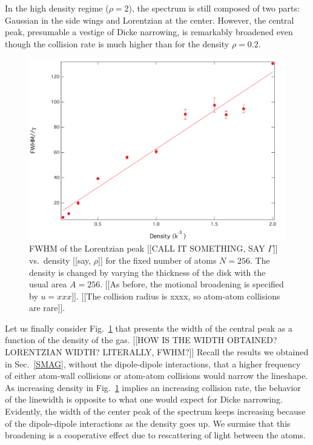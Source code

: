In the high density regime ($\rho =2$), the spectrum is still composed of two parts: Gaussian in the side wings and Lorentzian at the center. However, the central peak, presumable a vestige of Dicke narrowing, is remarkably broadened even though the collision rate is much higher than for the density $\rho =0.2$.

\begin{figure}[h!]
\begin{center}
\includegraphics[width=\textwidth]{FWHM.pdf}
\end{center}
\caption{FWHM of the Lorentzian peak [[CALL IT SOMETHING, SAY $\Gamma$]] vs.\ density [[say, $\rho$]] for the fixed number of atoms $N=256$. The density is changed by varying the thickness of the disk with the usual area $A=256$. [[As before, the motional broadening is specified by $u=xxx$]]. [[The collision radius is xxxx, so atom-atom collisions are rare]].}
\label{FWHM}
\end{figure}

Let us finally consider Fig.~\ref{FWHM} that presents the width of the central peak as a function of the density of the gas. [[HOW IS THE WIDTH OBTAINED? LORENTZIAN WIDTH? LITERALLY, FWHM?]]
Recall the results we obtained in Sec.~\ref{SMAG}, without the dipole-dipole interactions, that a higher frequency of either atom-wall collisions or atom-atom collisions would narrow the lineshape. As increasing density in Fig.~\ref{FWHM} implies an increasing collision rate, the behavior of the linewidth is opposite to what one would expect for Dicke narrowing. Evidently, the width of the center peak of the spectrum keeps increasing because of the dipole-dipole interactions as the density goes up.  We surmise that this broadening is a cooperative effect due to rescattering of light between the atoms.
